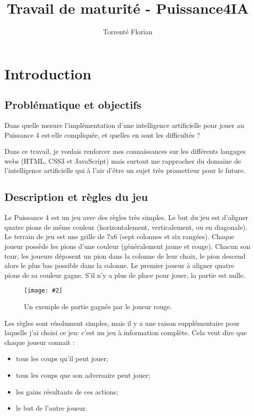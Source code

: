 \documentclass[a4paper]{article}
\author{Torrenté Florian}
\title{Travail de maturité - Puissance4IA}
\newcommand{\img}[3][]{
    \begin{figure}[H]
        \centering
        \texttt{[image: \#2]}
        \caption{#1}    
    \end{figure}
}
\begin{document}
\maketitle

\tableofcontents

\newpage
\section{Introduction}

\subsection{Problématique et objectifs}
    Dans quelle mesure l'implémentation d'une intelligence artificielle pour jouer au Puissance 4 est-elle compliquée, et quelles en sont les difficultés ?

    Dans ce travail, je voulais renforcer mes connaissances sur les différents langages webs (HTML, CSS3 et JavaScript) mais surtout me rapprocher du domaine de l'intelligence artificielle qui à l'air d'être un sujet très prometteur pour le future.

\subsection{Description et règles du jeu}
    Le Puissance 4 est un jeu avec des règles très simples. Le but du jeu est d'aligner quatre pions de même couleur (horizontalement, verticalement, ou en diagonale). Le terrain de jeu est une grille de 7x6 (sept colonnes et six rangées). Chaque joueur possède les pions d'une couleur (généralement jaune et rouge). Chacun son tour, les joueurs déposent un pion dans la colonne de leur choix, le pion descend alors le plus bas possible dans la colonne. Le premier joueur à aligner quatre pions de sa couleur gagne. S'il n'y a plus de place pour jouer, la partie est nulle.


    \img[Un exemple de partie gagnée par le joueur rouge.]{Images/puissance4.jpg}{0.5}

    Les règles sont résolument simples, mais il y a une raison supplémentaire pour laquelle j'ai choisi ce jeu: c'est un jeu à information complète. Cela veut dire que chaque joueur connait : \begin{itemize}
        \item tous les coups qu'il peut jouer;
        \item tous les coups que son adversaire peut jouer;
        \item les gains résultants de ces actions;
        \item le but de l'autre joueur.
    \end{itemize}
\end{document}
